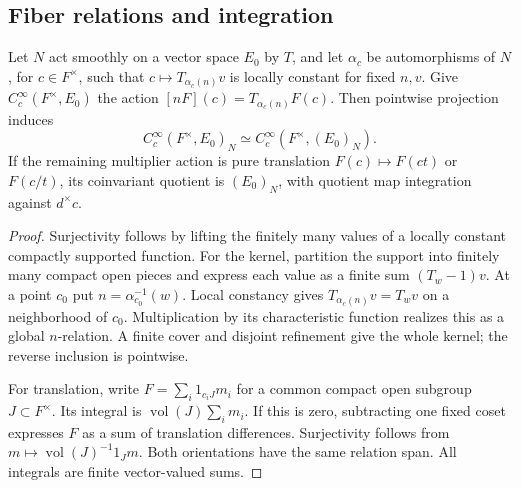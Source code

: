\subsection{Fiber relations and integration}
\begin{lemma}\label{gu:app:fibers}
Let $N$ act smoothly on a vector space $E_0$ by $T$, and let
$\alpha_c$ be automorphisms of $N$, for $c\in F^\times$, such that
$c\mapsto T_{\alpha_c(n)}v$ is locally constant for fixed $n,v$.
Give $C_c^\infty(F^\times,E_0)$ the action
$[nF](c)=T_{\alpha_c(n)}F(c)$. Then pointwise projection induces
\[
 C_c^\infty(F^\times,E_0)_N
 \simeq C_c^\infty(F^\times,(E_0)_N).
\]
If the remaining multiplier action is pure translation
$F(c)\mapsto F(ct)$ or $F(c/t)$, its coinvariant quotient is
$(E_0)_N$, with quotient map integration against $d^\times c$.
\end{lemma}
\begin{proof}
Surjectivity follows by lifting the finitely many values of a locally
constant compactly supported function. For the kernel, partition the
support into finitely many compact open pieces and express each value
as a finite sum $(T_w-1)v$. At a point $c_0$ put
$n=\alpha_{c_0}^{-1}(w)$. Local constancy gives
$T_{\alpha_c(n)}v=T_wv$ on a neighborhood of $c_0$. Multiplication by
its characteristic function realizes this as a global $n$-relation.
A finite cover and disjoint refinement give the whole kernel; the
reverse inclusion is pointwise.

For translation, write $F=\sum_i1_{c_iJ}m_i$ for a common compact open
subgroup $J\subset F^\times$. Its integral is
$\operatorname{vol}(J)\sum_i m_i$. If this is zero, subtracting one
fixed coset expresses $F$ as a sum of translation differences.
Surjectivity follows from
$m\mapsto\operatorname{vol}(J)^{-1}1_Jm$. Both orientations have the
same relation span. All integrals are finite vector-valued sums.
\end{proof}

